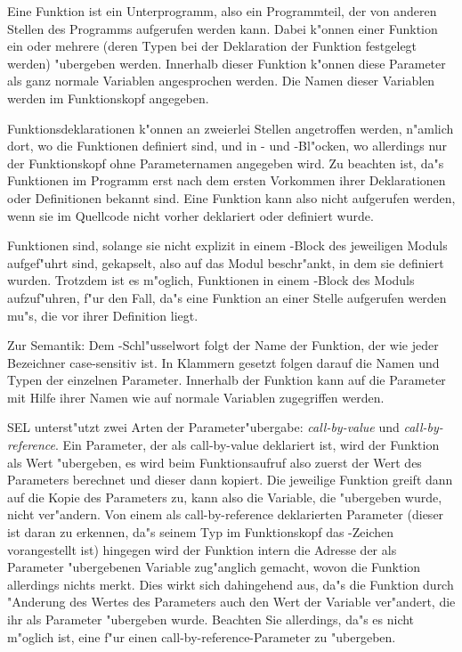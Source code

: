 Eine Funktion ist ein Unterprogramm,
also ein Programmteil, der
von anderen Stellen des Programms aufgerufen werden kann. Dabei
k"onnen einer Funktion ein oder mehrere  (deren
Typen bei der Deklaration der Funktion festgelegt werden)
"ubergeben werden. Innerhalb dieser Funktion k"onnen diese
Parameter als ganz normale Variablen angesprochen werden. Die
Namen dieser Variablen werden im Funktionskopf angegeben.

Funktionsdeklarationen k"onnen an zweierlei Stellen angetroffen
werden, n"amlich dort, wo die Funktionen definiert sind, und
in - und -Bl"ocken, wo allerdings nur der
Funktionskopf ohne Parameternamen angegeben wird. Zu beachten
ist, da"s Funktionen im Programm erst nach dem ersten Vorkommen
ihrer Deklarationen oder Definitionen bekannt sind. Eine Funktion
kann also nicht aufgerufen werden, wenn sie im Quellcode nicht
vorher deklariert oder definiert wurde.

Funktionen sind, solange sie nicht explizit in einem
-Block des jeweiligen Moduls aufgef"uhrt sind,
gekapselt, also auf das Modul beschr"ankt, in dem sie
definiert wurden. Trotzdem ist es m"oglich, Funktionen in einem
-Block des
Moduls aufzuf"uhren, f"ur den Fall, da"s eine Funktion an einer
Stelle aufgerufen werden mu"s, die vor ihrer Definition liegt.

Zur Semantik: Dem -Schl"usselwort folgt der Name der
Funktion, der wie jeder Bezeichner case-sensitiv ist. In Klammern
gesetzt folgen darauf die Namen und Typen der einzelnen Parameter.
Innerhalb der Funktion kann auf die Parameter mit Hilfe ihrer
Namen wie auf normale Variablen zugegriffen werden.

SEL unterst"utzt zwei Arten der Parameter"ubergabe:
{\em call-by-value} und {\em call-by-reference}. Ein
Parameter, der als call-by-value deklariert ist, wird der
Funktion als Wert "ubergeben, es wird beim Funktionsaufruf also
zuerst der Wert des Parameters berechnet und dieser dann kopiert.
Die jeweilige Funktion greift dann auf die Kopie des Parameters
zu, kann also die Variable, die "ubergeben wurde, nicht
ver"andern. Von einem als call-by-reference deklarierten Parameter
(dieser ist daran zu erkennen, da"s seinem Typ im Funktionskopf
das \fu{\&}-Zeichen
vorangestellt ist) hingegen wird der Funktion intern die Adresse
der als Parameter "ubergebenen Variable zug"anglich gemacht,
wovon die Funktion allerdings nichts merkt. Dies wirkt sich
dahingehend aus, da"s die Funktion durch "Anderung des Wertes des
Parameters auch den Wert der Variable ver"andert, die ihr als
Parameter "ubergeben wurde. Beachten Sie allerdings, da"s es
nicht m"oglich ist, eine  f"ur einen
call-by-reference-Parameter zu "ubergeben.

